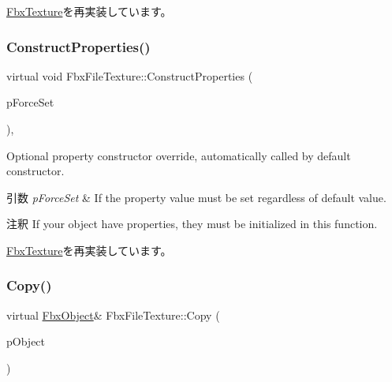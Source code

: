 \hyperlink{class_fbx_texture_afc81141345bc807a77dcbd9d6a0d8356}{Fbx\+Texture}を再実装しています。

\mbox{\label{class_fbx_file_texture_a698164ee49ac5fb2a5d5e3e7a2cb9e9f}} 
\subsubsection{\texorpdfstring{Construct\+Properties()}{ConstructProperties()}}
{\footnotesize\ttfamily virtual void Fbx\+File\+Texture\+::\+Construct\+Properties (\begin{DoxyParamCaption}\item[{bool}]{p\+Force\+Set }\end{DoxyParamCaption})\hspace{0.3cm}{\ttfamily [protected]}, {\ttfamily [virtual]}}

Optional property constructor override, automatically called by default constructor. 
\begin{DoxyParams}{引数}
{\em p\+Force\+Set} & If the property value must be set regardless of default value. \\
\hline
\end{DoxyParams}
\begin{DoxyRemark}{注釈}
If your object have properties, they must be initialized in this function. 
\end{DoxyRemark}


\hyperlink{class_fbx_texture_a851d5c4c96fb5023c004c88aeab2275b}{Fbx\+Texture}を再実装しています。

\mbox{\label{class_fbx_file_texture_a4ef7372132caebc8d1e5992efb894c9d}} 
\subsubsection{\texorpdfstring{Copy()}{Copy()}}
{\footnotesize\ttfamily virtual \hyperlink{class_fbx_object}{Fbx\+Object}\& Fbx\+File\+Texture\+::\+Copy (\begin{DoxyParamCaption}\item[{const \hyperlink{class_fbx_object}{Fbx\+Object} \&}]{p\+Object }\end{DoxyParamCaption})\hspace{0.3cm}{\ttfamily [virtual]}}

